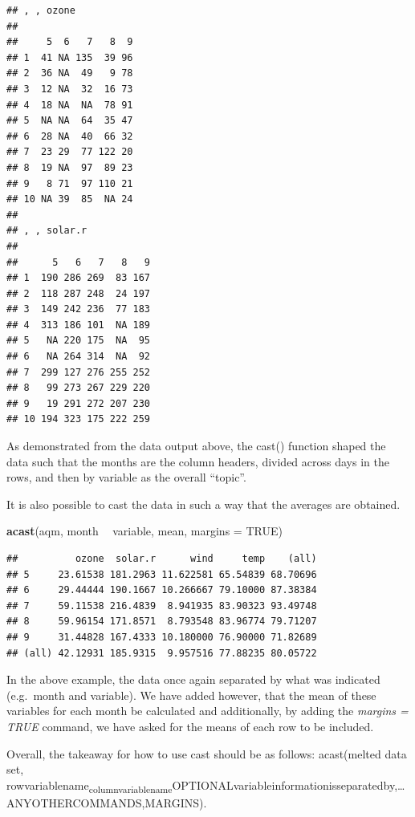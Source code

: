 \documentclass[]{book}
\newenvironment{Shaded}{\begin{snugshade}}{\end{snugshade}}
\newcommand{\DataTypeTok}[1]{\textcolor[rgb]{0.13,0.29,0.53}{#1}}
\newcommand{\KeywordTok}[1]{\textcolor[rgb]{0.13,0.29,0.53}{\textbf{#1}}}
\newcommand{\NormalTok}[1]{#1}
\newcommand{\OperatorTok}[1]{\textcolor[rgb]{0.81,0.36,0.00}{\textbf{#1}}}
\newcommand{\OtherTok}[1]{\textcolor[rgb]{0.56,0.35,0.01}{#1}}
\newcommand{\StringTok}[1]{\textcolor[rgb]{0.31,0.60,0.02}{#1}}
\begin{document}
\begin{verbatim}
## , , ozone
## 
##     5  6   7   8  9
## 1  41 NA 135  39 96
## 2  36 NA  49   9 78
## 3  12 NA  32  16 73
## 4  18 NA  NA  78 91
## 5  NA NA  64  35 47
## 6  28 NA  40  66 32
## 7  23 29  77 122 20
## 8  19 NA  97  89 23
## 9   8 71  97 110 21
## 10 NA 39  85  NA 24
## 
## , , solar.r
## 
##      5   6   7   8   9
## 1  190 286 269  83 167
## 2  118 287 248  24 197
## 3  149 242 236  77 183
## 4  313 186 101  NA 189
## 5   NA 220 175  NA  95
## 6   NA 264 314  NA  92
## 7  299 127 276 255 252
## 8   99 273 267 229 220
## 9   19 291 272 207 230
## 10 194 323 175 222 259
\end{verbatim}

As demonstrated from the data output above, the cast() function shaped the data such that the months are the column headers, divided across days in the rows, and then by variable as the overall ``topic''.

It is also possible to cast the data in such a way that the averages are obtained.

\begin{Shaded}
\begin{Highlighting}[]
\KeywordTok{acast}\NormalTok{(aqm, month }\OperatorTok{~}\StringTok{ }\NormalTok{variable, mean, }\DataTypeTok{margins =} \OtherTok{TRUE}\NormalTok{)}
\end{Highlighting}
\end{Shaded}

\begin{verbatim}
##          ozone  solar.r      wind     temp    (all)
## 5     23.61538 181.2963 11.622581 65.54839 68.70696
## 6     29.44444 190.1667 10.266667 79.10000 87.38384
## 7     59.11538 216.4839  8.941935 83.90323 93.49748
## 8     59.96154 171.8571  8.793548 83.96774 79.71207
## 9     31.44828 167.4333 10.180000 76.90000 71.82689
## (all) 42.12931 185.9315  9.957516 77.88235 80.05722
\end{verbatim}

In the above example, the data once again separated by what was indicated (e.g.~month and variable). We have added however, that the mean of these variables for each month be calculated and additionally, by adding the \emph{margins = TRUE} command, we have asked for the means of each row to be included.

Overall, the takeaway for how to use cast should be as follows: acast(melted data set, rowvariablename\textsubscript{columnvariablename}OPTIONALvariableinformationisseparatedby,\ldots{}ANYOTHERCOMMANDS,MARGINS).
\end{document}
